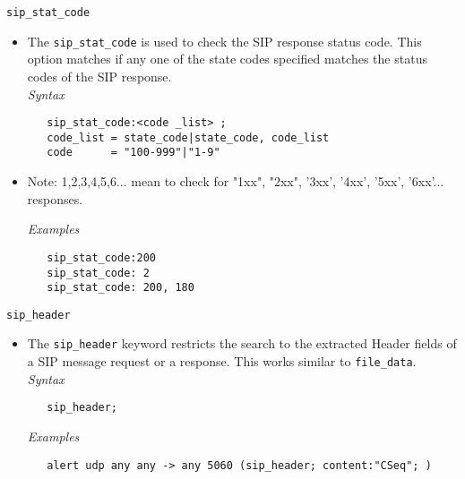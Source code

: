 \documentclass[english]{report}
\begin{document}
\texttt{sip\_stat\_code}
\label{sip:sip_stat_code}
\begin{itemize}
 \item[]  The \texttt{sip\_stat\_code} is used to check the SIP response status code.  This option
  matches if any one of the state codes specified matches the status codes of
  the SIP response.\\

\textit{Syntax}
\footnotesize
\begin{verbatim}
   sip_stat_code:<code _list> ;
   code_list = state_code|state_code, code_list
   code      = "100-999"|"1-9"   
\end{verbatim}
 \item[] Note: 1,2,3,4,5,6... mean to check for "1xx", "2xx", '3xx', '4xx', '5xx', 
          '6xx'... responses.  \\
\normalsize

\textit{Examples}
\footnotesize
\begin{verbatim}
   sip_stat_code:200  
   sip_stat_code: 2  
   sip_stat_code: 200, 180
\end{verbatim}
\normalsize
\end{itemize}

\texttt{sip\_header}
\label{sip:sip_header}
\begin{itemize}
 \item[]  The \texttt{sip\_header} keyword restricts the search to the extracted Header fields of 
  a SIP message request or a response. This works similar to \texttt{file\_data}. \\

\textit{Syntax}
\footnotesize
\begin{verbatim}
   sip_header;
\end{verbatim}
\normalsize

\textit{Examples}
\footnotesize
\begin{verbatim}
   alert udp any any -> any 5060 (sip_header; content:"CSeq"; )
\end{verbatim}
\normalsize
\end{itemize}
\end{document}
